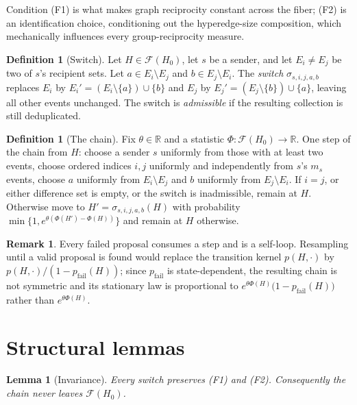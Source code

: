 \documentclass[11pt]{article}
\newtheorem{lemma}[theorem]{Lemma}
\theoremstyle{definition}
\newtheorem{definition}[theorem]{Definition}
\newtheorem{remark}[theorem]{Remark}
\newcommand{\Fcal}{\mathcal{F}}
\begin{document}
Condition (F1) is what makes graph reciprocity constant across the fiber;
(F2) is an identification choice, conditioning out the hyperedge-size
composition, which mechanically influences every group-reciprocity measure.

\begin{definition}[Switch]
Let $H\in\Fcal(H_0)$, let $s$ be a sender, and let $E_i\neq E_j$ be two of $s$'s
recipient sets. Let $a\in E_i\setminus E_j$ and $b\in E_j\setminus E_i$. The
\emph{switch} $\sigma_{s,i,j,a,b}$ replaces $E_i$ by
$E_i'=(E_i\setminus\{a\})\cup\{b\}$ and $E_j$ by
$E_j'=(E_j\setminus\{b\})\cup\{a\}$, leaving all other events unchanged. The
switch is \emph{admissible} if the resulting collection is still deduplicated.
\end{definition}

\begin{definition}[The chain]
Fix $\theta\in\mathbb{R}$ and a statistic $\Phi:\Fcal(H_0)\to\mathbb{R}$. One
step of the chain from $H$: choose a sender $s$ uniformly from those with at
least two events, choose ordered indices $i,j$ uniformly and independently from
$s$'s $m_s$ events, choose $a$ uniformly from $E_i\setminus E_j$ and $b$
uniformly from $E_j\setminus E_i$. If $i=j$, or either difference set is empty,
or the switch is inadmissible, remain at $H$. Otherwise move to
$H'=\sigma_{s,i,j,a,b}(H)$ with probability $\min\{1,e^{\theta(\Phi(H')-\Phi(H))}\}$
and remain at $H$ otherwise.
\end{definition}

\begin{remark}
Every failed proposal consumes a step and is a self-loop. Resampling until a
valid proposal is found would replace the transition kernel $p(H,\cdot)$ by
$p(H,\cdot)/(1-p_{\mathrm{fail}}(H))$; since $p_{\mathrm{fail}}$ is
state-dependent, the resulting chain is not symmetric and its stationary law is
proportional to $e^{\theta\Phi(H)}\bigl(1-p_{\mathrm{fail}}(H)\bigr)$ rather
than $e^{\theta\Phi(H)}$.
\end{remark}

\section{Structural lemmas}

\begin{lemma}[Invariance]\label{lem:inv}
Every switch preserves (F1) and (F2). Consequently the chain never leaves
$\Fcal(H_0)$.
\end{lemma}
\end{document}

